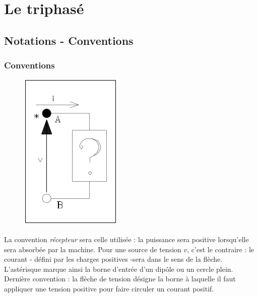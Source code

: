 \chapter{Le triphasé}
\section{Notations - Conventions}
	
	\subsection{Conventions}
	\begin{figure}
	\vspace{-5mm}
	\includegraphics[scale=0.4]{ch1/image1.png}
	\end{figure}
	La convention \textit{récepteur} sera celle utilisée : la puissance 
	sera positive lorsqu'elle sera absorbée par la machine. Pour une 
	source de tension $v$, c'est le contraire : le courant - défini par 
	les charges positives -sera dans le sens de la flèche.\\

	 L'astérisque 
	marque ainsi la borne d'entrée d'un dipôle ou un cercle plein.\\
	
	Dernière convention : la flèche de tension désigne la borne à 
	laquelle il faut appliquer une tension positive pour faire circuler 
	un courant positif.
	
